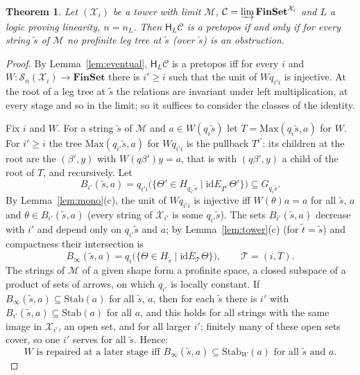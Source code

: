 \documentclass[11pt]{amsart}
\newtheorem{thm}{Theorem}[section]
\theoremstyle{definition}
\newcommand{\Fin}{\mathbf{FinSet}}
\newcommand{\HH}{\mathsf H}
\newcommand{\cX}{\mathcal X}
\newcommand{\cC}{\mathcal C}
\newcommand{\cM}{\mathcal M}
\newcommand{\cS}{\mathcal S}
\newcommand{\id}{\mathrm{id}}
\begin{document}
\begin{thm}\label{thm:proftree}
Let $(\cX_i)$ be a tower with limit $\cM$, $\cC=\varinjlim\Fin^{\cX_i}$
and $L$ a logic proving linearity, $n=n_L$. Then $\HH_L\cC$
is a pretopos if and only if for every string $\tilde s$ of $\cM$ no
profinite leg tree at $\tilde s$ (over $\tilde s$) is an obstruction.
\end{thm}
\begin{proof}
By Lemma~\ref{lem:eventual}, $\HH_L\cC$ is a
pretopos iff for every $i$ and $W\colon\cS_n(\cX_i)\to\Fin$ there is
$i'\ge i$ such that the unit of $Wq_{i'i}$ is injective. At the root
of a leg tree at $\tilde s$ the relations are invariant under left
multiplication, at every stage and so in the limit; so it suffices to
consider the classes of the identity.

Fix $i$ and $W$. For a string $\tilde s$ of $\cM$ and $a\in W(q_i
\tilde s)$ let $T=\mathrm{Max}(q_i\tilde s,a)$ for $W$. For $i'\ge i$
the tree $\mathrm{Max}(q_{i'}\tilde s,a)$ for $Wq_{i'i}$ is the
pullback $T^{i'}$: its children at the root are the $(\beta',y)$ with
$W(q\beta')y=a$, that is with $(q\beta',y)$ a child of the root of
$T$, and recursively. Let
\[
B_{i'}(\tilde s,a)=q_{i'i}\bigl(\{\Theta'\in H_{q_{i'}\tilde s}\mid
\id\mathrel{E_{T^{i'}}}\Theta'\}\bigr)\subseteq G_{q_i\tilde s}.
\]
By Lemma~\ref{lem:mono}(c), the unit of $Wq_{i'i}$ is injective iff
$W(\theta)a=a$ for all $\tilde s$, $a$ and $\theta\in B_{i'}(\tilde
s,a)$ (every string of $\cX_{i'}$ is some $q_{i'}\tilde s$). The sets
$B_{i'}(\tilde s,a)$ decrease with $i'$ and depend only on $q_{i'}
\tilde s$ and $a$; by Lemma~\ref{lem:tower}(c) (for $\tilde t=\tilde
s$) and compactness their intersection is
\[
B_\infty(\tilde s,a)=q_i\bigl(\{\Theta\in H_{\tilde s}\mid\id\mathrel{
\bar E_{\mathcal T}}\Theta\}\bigr),\qquad\mathcal T=(i,T).
\]
The strings of $\cM$ of a given shape form a profinite space, a closed
subspace of a product of sets of arrows, on which $q_{i'}$ is locally
constant. If $B_\infty(\tilde s,a)\subseteq\mathrm{Stab}(a)$ for all
$\tilde s$, $a$, then for each $\tilde s$ there is $i'$ with $B_{i'}
(\tilde s,a)\subseteq\mathrm{Stab}(a)$ for all $a$, and this holds for
all strings with the same image in $\cX_{i'}$, an open set, and for
all larger $i'$; finitely many of these open sets cover, so one $i'$
serves for all $\tilde s$. Hence:
\begin{equation}\label{eq:W}
\text{$W$ is repaired at a later stage iff $B_\infty(\tilde
s,a)\subseteq\mathrm{Stab}_W(a)$ for all $\tilde s$ and $a$.}
\end{equation}


\end{proof}
\end{document}
